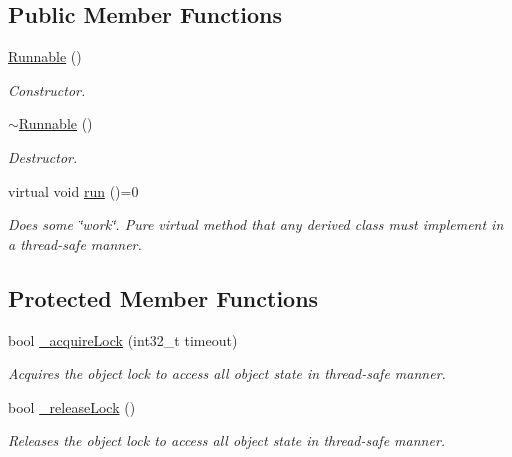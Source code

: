 \subsection*{Public Member Functions}
\begin{DoxyCompactItemize}
\item 
\hypertarget{classxmem_1_1thread_1_1_runnable_a19af0a2e2b8f986c51196b9c4b2340fb}{\hyperlink{classxmem_1_1thread_1_1_runnable_a19af0a2e2b8f986c51196b9c4b2340fb}{Runnable} ()}\label{classxmem_1_1thread_1_1_runnable_a19af0a2e2b8f986c51196b9c4b2340fb}

\begin{DoxyCompactList}\small\item\em Constructor. \end{DoxyCompactList}\item 
\hypertarget{classxmem_1_1thread_1_1_runnable_a3bf7483afb8d40ec8dbec57efb64f0c2}{\hyperlink{classxmem_1_1thread_1_1_runnable_a3bf7483afb8d40ec8dbec57efb64f0c2}{$\sim$\-Runnable} ()}\label{classxmem_1_1thread_1_1_runnable_a3bf7483afb8d40ec8dbec57efb64f0c2}

\begin{DoxyCompactList}\small\item\em Destructor. \end{DoxyCompactList}\item 
\hypertarget{classxmem_1_1thread_1_1_runnable_af2915224b03db20403550291672733a7}{virtual void \hyperlink{classxmem_1_1thread_1_1_runnable_af2915224b03db20403550291672733a7}{run} ()=0}\label{classxmem_1_1thread_1_1_runnable_af2915224b03db20403550291672733a7}

\begin{DoxyCompactList}\small\item\em Does some \char`\"{}work\char`\"{}. Pure virtual method that any derived class must implement in a thread-\/safe manner. \end{DoxyCompactList}\end{DoxyCompactItemize}
\subsection*{Protected Member Functions}
\begin{DoxyCompactItemize}
\item 
bool \hyperlink{classxmem_1_1thread_1_1_runnable_ad2a24a9e69f4592ceb1356d28d45f784}{\-\_\-acquire\-Lock} (int32\-\_\-t timeout)
\begin{DoxyCompactList}\small\item\em Acquires the object lock to access all object state in thread-\/safe manner. \end{DoxyCompactList}\item 
bool \hyperlink{classxmem_1_1thread_1_1_runnable_aacef5cf385638157e24e7a33d0a4e450}{\-\_\-release\-Lock} ()
\begin{DoxyCompactList}\small\item\em Releases the object lock to access all object state in thread-\/safe manner. \end{DoxyCompactList}\end{DoxyCompactItemize}



